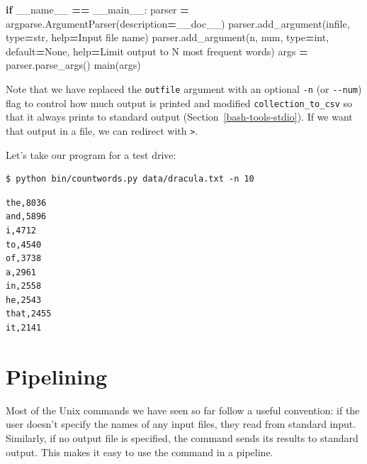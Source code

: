\documentclass[
]{krantz}
\makeatletter
\newenvironment{Shaded}{\begin{snugshade}}{\end{snugshade}}
\newcommand{\BuiltInTok}[1]{#1}
\newcommand{\ControlFlowTok}[1]{\textcolor[rgb]{0.13,0.29,0.53}{\textbf{#1}}}
\newcommand{\NormalTok}[1]{#1}
\newcommand{\OperatorTok}[1]{\textcolor[rgb]{0.81,0.36,0.00}{\textbf{#1}}}
\newcommand{\StringTok}[1]{\textcolor[rgb]{0.31,0.60,0.02}{#1}}
\newcommand{\VariableTok}[1]{\textcolor[rgb]{0.00,0.00,0.00}{#1}}
\newenvironment{kframe}{%
\medskip{}
\setlength{\fboxsep}{.8em}
 \def\at@end@of@kframe{}%
 \ifinner\ifhmode%
  \def\at@end@of@kframe{\end{minipage}}%
  \begin{minipage}{\columnwidth}%
 \fi\fi%
 \def\FrameCommand##1{\hskip\@totalleftmargin \hskip-\fboxsep
 \colorbox{shadecolor}{##1}\hskip-\fboxsep
     \hskip-\linewidth \hskip-\@totalleftmargin \hskip\columnwidth}%
 \MakeFramed {\advance\hsize-\width
   \@totalleftmargin\z@ \linewidth\hsize
   \@setminipage}}%
 {\par\unskip\endMakeFramed%
 \at@end@of@kframe}
\renewenvironment{Shaded}{\begin{kframe}}{\end{kframe}}
\makeatother
\begin{document}
\begin{Shaded}
\begin{Highlighting}[]
\ControlFlowTok{if} \VariableTok{\_\_name\_\_} \OperatorTok{==} \StringTok{\textquotesingle{}\_\_main\_\_\textquotesingle{}}\NormalTok{:}
\NormalTok{    parser }\OperatorTok{=}\NormalTok{ argparse.ArgumentParser(description}\OperatorTok{=}\NormalTok{\_\_doc\_\_)}
\NormalTok{    parser.add\_argument(}\StringTok{\textquotesingle{}infile\textquotesingle{}}\NormalTok{, }\BuiltInTok{type}\OperatorTok{=}\BuiltInTok{str}\NormalTok{, }\BuiltInTok{help}\OperatorTok{=}\StringTok{\textquotesingle{}Input file name\textquotesingle{}}\NormalTok{)}
\NormalTok{    parser.add\_argument(}\StringTok{\textquotesingle{}{-}n\textquotesingle{}}\NormalTok{, }\StringTok{\textquotesingle{}{-}{-}num\textquotesingle{}}\NormalTok{, }\BuiltInTok{type}\OperatorTok{=}\BuiltInTok{int}\NormalTok{, default}\OperatorTok{=}\VariableTok{None}\NormalTok{,}
                        \BuiltInTok{help}\OperatorTok{=}\StringTok{\textquotesingle{}Limit output to N most frequent words\textquotesingle{}}\NormalTok{)}
\NormalTok{    args }\OperatorTok{=}\NormalTok{ parser.parse\_args()}
\NormalTok{    main(args)}
\end{Highlighting}
\end{Shaded}

Note that we have replaced the \texttt{\textquotesingle{}outfile\textquotesingle{}} argument with an optional \texttt{-n} (or \texttt{-\/-num}) flag
to control how much output is printed
and modified \texttt{collection\_to\_csv} so that it always prints to standard output
(Section~\ref{bash-tools-stdio}).
If we want that output in a file,
we can redirect with \texttt{\textgreater{}}.

Let's take our program for a test drive:

\begin{verbatim}
$ python bin/countwords.py data/dracula.txt -n 10
\end{verbatim}

\begin{verbatim}
the,8036
and,5896
i,4712
to,4540
of,3738
a,2961
in,2558
he,2543
that,2455
it,2141
\end{verbatim}

\hypertarget{scripting-pipeline}{%
\section{Pipelining}\label{scripting-pipeline}}

Most of the Unix commands we have seen so far follow a useful convention:
if the user doesn't specify the names of any input files,
they read from standard input.
Similarly,
if no output file is specified,
the command sends its results to standard output.
This makes it easy to use the command in a pipeline.
\end{document}
